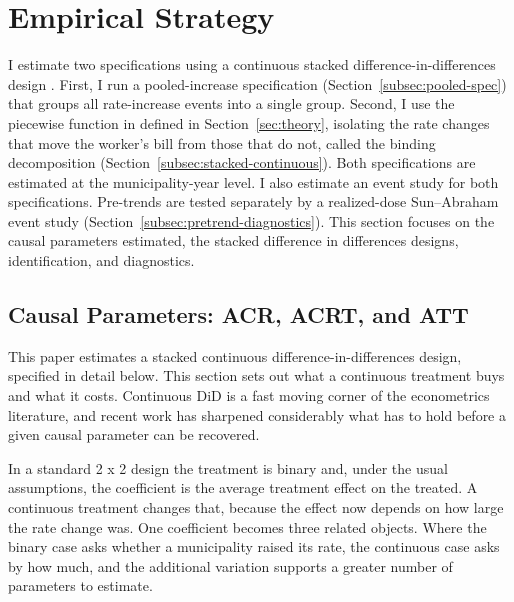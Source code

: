 \documentclass[12pt]{article}
\begin{document}
\section{Empirical Strategy}
\label{sec:strategy}

I estimate two specifications using a continuous stacked
difference-in-differences design \citep{cengizEffectMinimumWages2019a}. First, I run a pooled-increase specification (Section~\ref{subsec:pooled-spec}) that groups all
rate-increase events into a single
group. Second, I use the piecewise function in defined in
Section~\ref{sec:theory}, isolating the rate changes that move the
worker's bill from those that do not, called the binding
decomposition (Section~\ref{subsec:stacked-continuous}). Both specifications are
estimated at the municipality-year level. I also estimate an event study for both specifications. Pre-trends are tested
separately by a realized-dose Sun--Abraham event study
(Section~\ref{subsec:pretrend-diagnostics}). This section focuses on the causal parameters estimated,
the stacked difference in differences designs, identification, and diagnostics.


\subsection{Causal Parameters: ACR, ACRT, and ATT}
\label{subsec:causal-params}

This paper estimates a stacked continuous difference-in-differences
design, specified in detail below. This section sets out what a
continuous treatment buys and what it costs. Continuous DiD is a fast
moving corner of the econometrics literature, and recent work has
sharpened considerably what has to hold before a given causal parameter
can be recovered.

In a standard 2 x 2 design the treatment is binary and, under the
usual assumptions, the coefficient is the average treatment effect on the
treated. A continuous treatment changes that, because the effect now
depends on how large the rate change was. One coefficient becomes three
related objects. Where the binary case asks whether a municipality
raised its rate, the continuous case asks by how much, and the additional
variation supports a greater number of parameters to estimate.
\end{document}
